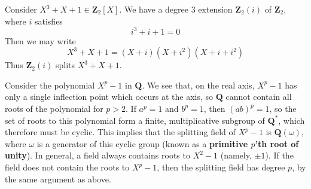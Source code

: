 \begin{example}
    Consider $X^3 + X + 1 \in \mathbf{Z}_2[X]$. We have a degree 3 extension $\mathbf{Z}_2(i)$ of $\mathbf{Z}_2$, where $i$ satisfies
    \[ i^3 + i + 1 = 0 \]
    Then we may write
    \[ X^3 + X + 1 = (X + i)(X + i^2)(X + i + i^2) \]
    Thus $\mathbf{Z}_2(i)$ splits $X^3 + X + 1$.
\end{example}

\begin{example}
    Consider the polynomial $X^p - 1$ in $\mathbf{Q}$. We see that, on the real axis, $X^p - 1$ has only a single inflection point which occurs at the axis, so $\mathbf{Q}$ cannot contain all roots of the polynomial for $p > 2$. If $a^p = 1$ and $b^p = 1$, then $(ab)^p = 1$, so the set of roots to this polynomial form a finite, multiplicative subgroup of $\mathbf{Q}^*$, which therefore must be cyclic. This implies that the splitting field of $X^p - 1$ is $\mathbf{Q}(\omega)$, where $\omega$ is a generator of this cyclic group (known as a {\bf primitive $p$'th root of unity}). In general, a field always contains roots to $X^2 - 1$ (namely, $\pm 1$). If the field does not contain the roots to $X^p - 1$, then the splitting field has degree $p$, by the same argument as above.
\end{example}

